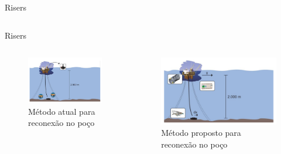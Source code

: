 \documentclass[10pt]{beamer}
\begin{document}
\begin{frame}[fragile]{Risers}
\begin{columns}[T]
\begin{column}{.5\textwidth}
\end{column}%
\end{columns}

\end{frame}
\begin{frame}[fragile]{Risers}
  \begin{columns}[T] %
\begin{column}{.5\textwidth}

\begin{figure}[!ht]
\centering
\includegraphics[width=1\linewidth]{figures/introducao/posicionamentoAtual}
\caption{Método atual para reconexão no poço \cite{redytton}}
\end{figure}


\end{column}%
\hfill%
\begin{column}{.5\textwidth}

\begin{figure}[!ht]
\centering
\includegraphics[width=1\linewidth]{figures/introducao/posicionamentoProposto}
\caption{Método proposto para reconexão no poço \cite{redytton}}
\end{figure}

\end{column}%
\end{columns}

\end{frame}
\end{document}
